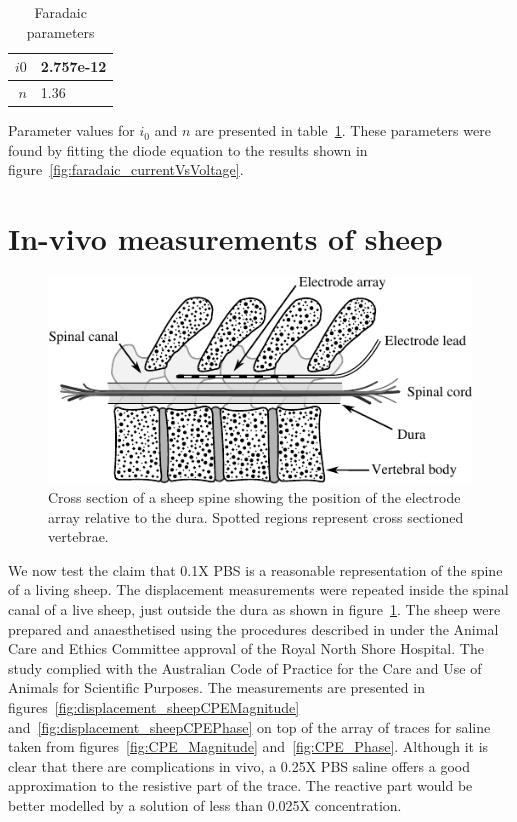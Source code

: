 \documentclass[journal, a4paper]{IEEEtran}
\begin{document}
{\begin{table}
    \begin{center}
        \begin{tabular}{|r|l|}
            \hline
            $i0$ & 2.757e-12\\ \hline
            $n$ & 1.36\\ \hline
        \end{tabular}
    \end{center}
    \caption{Faradaic parameters}
    \label{tab:FaradaicParams}
\end{table}

Parameter values for $i_{0}$ and $n$ are presented in table~\ref{tab:FaradaicParams}. These parameters were found by fitting the diode equation to the results shown in figure~\ref{fig:faradaic_currentVsVoltage}.

\section{In-vivo measurements of sheep}

\begin{figure}
    \begin{center}
        \includegraphics{graphics/sheepSpine}
    \end{center}
    \caption{Cross section of a sheep spine showing the position of the electrode array relative to the dura. Spotted regions represent cross sectioned vertebrae.}
    \label{fig:sheepSpine}
\end{figure}

We now test the claim that 0.1X PBS is a reasonable representation of the spine of a living sheep.
The displacement measurements were repeated inside the spinal canal of a live sheep, just outside the dura as shown in figure~\ref{fig:sheepSpine}. The sheep were prepared and anaesthetised using the procedures described in \cite{Parker2013} under the Animal Care and Ethics Committee approval of the Royal North Shore Hospital. The study complied with the Australian Code of Practice for the Care and Use of Animals for Scientific Purposes. The measurements are presented in figures~\ref{fig:displacement_sheepCPEMagnitude} and~\ref{fig:displacement_sheepCPEPhase} on top of the array of traces for saline taken from figures~\ref{fig:CPE_Magnitude}
and~\ref{fig:CPE_Phase}.
Although it is clear that there are complications in vivo, a 0.25X PBS saline offers a good approximation to the resistive part of the trace.
The reactive part would be better modelled by a solution of less than 0.025X concentration.


}
\end{document}
